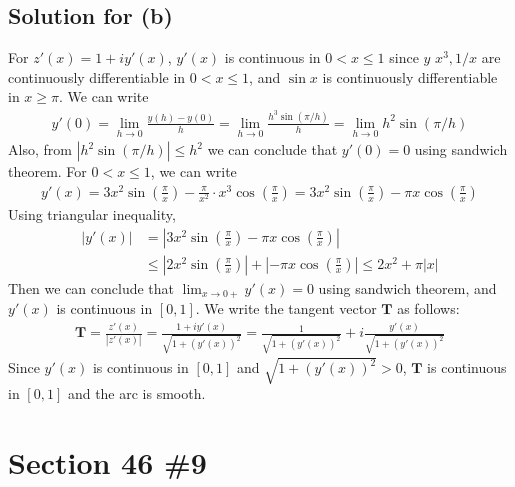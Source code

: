 \documentclass{scrartcl}
\begin{document}
\subsection{Solution for (b)}
For \(z'(x) = 1 + iy'(x)\), \(y'(x)\) is continuous in \(0 < x \leq 1\) since \(y\) \(x^3, 1 / x\) are continuously differentiable in \(0 < x \leq 1\), and \(\sin x\) is continuously differentiable in \(x \geq \pi\).
We can write
\begin{align*}
  y'(0) = \lim_{h \to 0} \frac{y(h) - y(0)}{h} = \lim_{h \to 0} \frac{h^3 \sin(\pi / h)}{h} = \lim_{h \to 0} h^2 \sin(\pi / h)
\end{align*}
Also, from \(|h^2 \sin(\pi / h)| \leq h^2\) we can conclude that \(y'(0) = 0\) using sandwich theorem.
For \(0 < x \leq 1\), we can write
\begin{align*}
  y'(x) = 3x^2 \sin \left( \frac{\pi}{x} \right) - \frac{\pi}{x^2} \cdot x^3 \cos \left( \frac{\pi}{x} \right) = 3x^2 \sin \left( \frac{\pi}{x} \right) - \pi x \cos \left( \frac{\pi}{x} \right)
\end{align*}
Using triangular inequality,
\begin{align*}
  |y'(x)| &= \left| 3x^2 \sin \left( \frac{\pi}{x} \right) - \pi x \cos \left( \frac{\pi}{x} \right) \right| \\
          &\leq \left| 2x^2 \sin \left( \frac{\pi}{x} \right) \right| + \left| -\pi x \cos \left( \frac{\pi}{x} \right) \right| \leq 2x^2 + \pi |x|
\end{align*}
Then we can conclude that \(\lim_{x \to 0+} y'(x) = 0\) using sandwich theorem, and \(y'(x)\) is continuous in \([0, 1]\).
We write the tangent vector \(\mathbf{T}\) as follows:
\begin{align*}
  \mathbf{T} = \frac{z'(x)}{|z'(x)|} = \frac{1 + iy'(x)}{\sqrt{1 + (y'(x))^2}} = \frac{1}{\sqrt{1 + (y'(x))^2}} + i \frac{y'(x)}{\sqrt{1 + (y'(x))^2}}
\end{align*}
Since \(y'(x)\) is continuous in \([0, 1]\) and \(\sqrt{1 + (y'(x))^2} > 0\), \(\mathbf{T}\) is continuous in \([0, 1]\) and the arc is smooth.

\section{Section 46 \#9}
\end{document}
